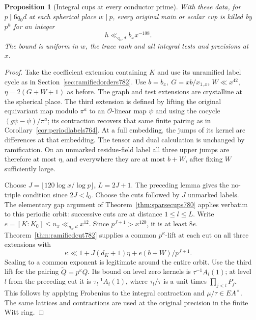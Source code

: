 \documentclass[a4paper,11pt]{article}
\newtheorem{proposition}{Proposition}[section]
\theoremstyle{definition}
\theoremstyle{remark}
\numberwithin{equation}{section}
\begin{document}
\begin{proposition}[Integral cups at every conductor prime]
\leavevmode\label{prop:conductorcups783}
With these data, for \(p\mid6q_0d\) at each spherical
place \(w\mid p\), every original main or scalar cup
is killed by \(p^h\) for an integer
\[
                      h\ll_{q_0,d} b_x x^{-108}.
\]
The bound is uniform in \(w\), the trace rank and all
integral tests and precisions at \(x\).
\end{proposition}
\begin{proof}
Take the coefficient extension containing \(K\) and use
its unramified label cycle as in
Section~\ref{sec:ramifiedorders782}. Use \(b=b_x,\ G=xb/x_{1,x}\),
\(W\ll x^{42}\), \(\eta=2(G+W+1)\) as before.
The graph and test extensions are crystalline at the
spherical place. The third extension is defined by
lifting the original equivariant map modulo \(\pi^a\)
to an \(\mathcal O\)-linear map \(\psi\) and using the
cocycle \((g\psi-\psi)/\pi^a\); its contraction recovers
that same finite pairing as in
Corollary~\ref{cor:periodlabels764}. At a full embedding,
the jumps of its kernel are differences at that embedding.
The tensor and dual calculation is unchanged by ramification.
On an unmarked residue-field label all three upper jumps
are therefore at most \(\eta\), and everywhere they are
at most \(b+W\), after fixing \(W\) sufficiently large.

Choose \(J=\lfloor120\log x/\log p\rfloor\),
\(L=2J+1\). The preceding lemma gives the no-triple
condition since \(2J<l_0\). Choose the cuts followed
by \(J\) unmarked labels. The elementary gap argument
of Theorem~\ref{thm:sparsecups780} applies verbatim to
this periodic orbit: successive cuts are at distance
\(1\le l\le L\). Write \(e=[K:K_0]\le n_x\ll_{q_0,d}x^{12}\).
Since \(p^{J+1}>x^{120}\), it is at least \(8e\).
Theorem~\ref{thm:ramifiedcut782} supplies a common
\(p^\kappa\)-lift at each cut on all three extensions with
\[
          \kappa\ll 1+J(d_K+1)\eta+e(b+W)/p^{J+1}.
\]
Scaling to a common exponent is legitimate around the
entire orbit. Use the third lift for the pairing
\(\widetilde Q=p^\kappa Q\). Its bound on level zero
kernels is \(\tau^{-1}A_i(1)\); at level \(l\) from the
preceding cut it is \(\tau_l^{-1}A_i(1)\), where
\(\tau_l/\tau\) is a unit times \(\prod_{j<l}P_j\).
This follows by applying Frobenius to the integral
contraction and \(\mu/\tau\in E A^\times\). The same
lattices and contractions are used at the original
precision in the finite Witt ring.


\end{proof}
\end{document}
